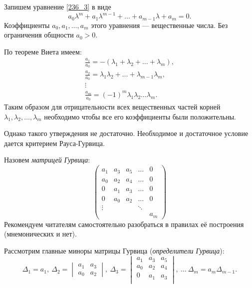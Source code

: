 Запишем уравнение \eqref{236_3} в виде
\begin{equation}
	a_0 \lambda^m + a_1 \lambda^{m-1} + \ldots + a_{m-1}\lambda + a_m = 0.
	\label{238_14}
\end{equation}
Коэффициенты $a_0, a_1,\ldots,a_m$ этого уравнения --- вещественные числа. Без ограничения общности $a_0 >0$.

По теореме Виета имеем:
\begin{gather*}
	\frac{a_1}{a_0} = - (\lambda_1 + \lambda_2 + \ldots + \lambda_m),\\
	\frac{a_2}{a_0} = \lambda_1 \lambda_2 + \ldots + \lambda_{m-1} \lambda_m,\\
	\vdots\\
	\frac{a_m}{a_0} = (-1)^m \lambda_1 \lambda_2 \ldots \lambda_m.
\end{gather*}
Таким образом для отрицательности всех вещественных частей корней $\lambda_1, \lambda_2, \ldots, \lambda_m$ необходимо чтобы все его коэффициенты были положительны.

Однако такого утверждения не достаточно. Необходимое и достаточное условие дается критерием Рауса-Гурвица.

\begin{to_def}
	Назовем \textit{матрицей Гурвица}:
	\begin{equation*}
		\begin{pmatrix}
		    a_1 & a_3 & a_5 & \ldots & 0 \\
		    a_0 & a_2 & a_4 & \ldots & 0 \\
		    0 & a_1 & a_3 & \ldots & 0 \\
		    0 & a_0 & a_2 & \ldots & 0 \\
		    \vdots &  & & \ddots & \\
		    & & & & a_m
		\end{pmatrix}
	\end{equation*} 
	Рекомендуем читателям самостоятельно разобраться в правилах её построения (мнемонических и нет).
\end{to_def}

Рассмотрим главные миноры матрицы Гурвица (\textit{определители Гурвица}):
\begin{equation*}
	\Delta_1 = a_1, 
	\ 
	\Delta_2 = \begin{vmatrix} a_1& a_3\\ a_0&a_2\end{vmatrix},
	\
	\Delta_3 = \begin{vmatrix}
	    a_1 & a_3 & a_5 \\
	    a_0 & a_2 & a_4 \\
	    0 & a_1 & a_3 \\
	\end{vmatrix},
	\ \ldots \ 
	\Delta_m = a_m \Delta_{m-1}.
\end{equation*}

